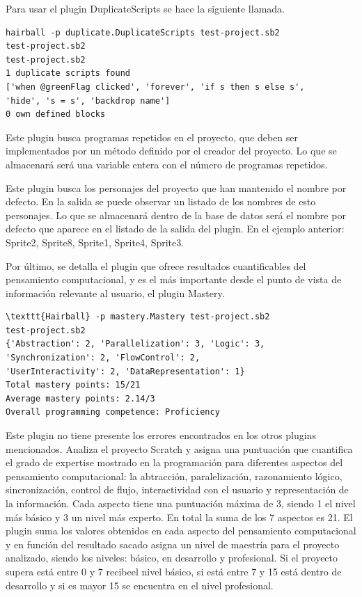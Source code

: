 \documentclass[a4paper, 12pt]{book}
\begin{document}
Para usar el plugin DuplicateScripts se hace la siguiente llamada.
\begingroup
\fontsize{7pt}{8pt}\selectfont
\begin{verbatim}
hairball -p duplicate.DuplicateScripts test-project.sb2 
test-project.sb2
test-project.sb2
1 duplicate scripts found
['when @greenFlag clicked', 'forever', 'if s then s else s',
'hide', 's = s', 'backdrop name']
0 own defined blocks
\end{verbatim}
\endgroup

Este plugin busca programas repetidos en el proyecto, que deben ser implementados por un
método definido por el creador del proyecto. Lo que se almacenará será una variable entera
con el número de programas repetidos.

Este plugin busca los personajes del proyecto que han mantenido el nombre por defecto. En
la salida se puede observar un listado de los nombres de esto personajes. Lo que se 
almacenará dentro de la base de datos será el nombre por defecto que aparece en el listado
de la salida del plugin. En el ejemplo anterior: Sprite2, Sprite8, Sprite1, Sprite4, Sprite3.


Por último, se detalla el plugin que ofrece resultados cuantificables del pensamiento 
computacional, y es el más importante desde el punto de vista de información relevante
al usuario, el plugin Mastery.

\begingroup
\fontsize{7pt}{8pt}\selectfont
\begin{verbatim}
\texttt{Hairball} -p mastery.Mastery test-project.sb2 
test-project.sb2
{'Abstraction': 2, 'Parallelization': 3, 'Logic': 3, 'Synchronization': 2, 'FlowControl': 2,
'UserInteractivity': 2, 'DataRepresentation': 1}
Total mastery points: 15/21
Average mastery points: 2.14/3
Overall programming competence: Proficiency
\end{verbatim}
\endgroup

Este plugin no tiene presente los errores encontrados en los otros plugins mencionados.
Analiza el proyecto Scratch y asigna una puntuación que cuantifica el grado de expertise
mostrado en la programación para diferentes aspectos del pensamiento computacional: la
abtracción, paralelización, razonamiento lógico, sincronización, control de flujo,
interactividad con el usuario y representación de la información. Cada aspecto tiene
una puntuación máxima de 3, siendo 1 el nivel más básico y 3 un nivel más experto. En
total la suma de los 7 aspectos es 21. El plugin suma los valores obtenidos en cada 
aspecto del pensamiento computacional y en función del resultado sacado asigna un
nivel de maestría para el proyecto analizado, siendo los niveles: básico, en desarrollo
y profesional. Si el proyecto supera está entre 0 y 7 recibeel nivel básico, si está 
entre 7 y 15 está dentro de desarrollo y si es mayor 15 se encuentra en el nivel
profesional.
\end{document}
